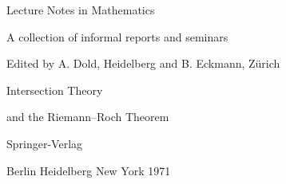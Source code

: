 \begin{center}
{\Large Lecture Notes in Mathematics}\par
A collection of informal reports and seminars\par
Edited by A. Dold, Heidelberg and B. Eckmann, Zürich\par
{}\par
\bigskip
{\Large Intersection Theory\par
and the Riemann--Roch Theorem}\par
\bigskip
Springer-Verlag\par
Berlin \textperiodcentered{} Heidelberg \textperiodcentered{} New York 1971
\end{center}

